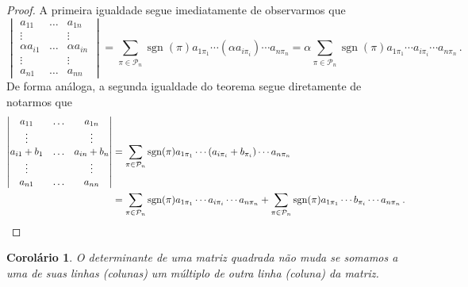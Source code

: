 \documentclass[12pt,a4paper]{report}
\newcommand{\mc}{\mathcal}
\newtheorem{cor}[thm]{Corolário}
\DeclareMathOperator{\sgn}{sgn}
\begin{document}
\begin{proof}
  A primeira igualdade segue imediatamente de observarmos que
  $$\begin{vmatrix}
    a_{11}&\ldots& a_{1n}\\
    \vdots&&\vdots\\
    \alpha a_{i1}&\ldots&\alpha a_{in}\\
    \vdots&&\vdots\\
    a_{n1}&\ldots&a_{nn}
  \end{vmatrix}=\sum_{\pi\in\mc P_n}\sgn(\pi)a_{1\pi_1}\cdots (\alpha a_{i\pi_i})\cdots a_{n\pi_n}
  =\alpha\sum_{\pi\in\mc P_n}\sgn(\pi)a_{1\pi_1}\cdots a_{i\pi_i}\cdots a_{n\pi_n}\,.$$
  De forma análoga, a segunda igualdade do teorema segue diretamente de notarmos que
  \begin{equation*}
    \begin{split}
      \begin{vmatrix}
        a_{11}&\ldots& a_{1n}\\
        \vdots&&\vdots\\
        a_{i1}+b_1&\ldots&a_{in}+b_n\\
        \vdots&&\vdots\\
        a_{n1}&\ldots&a_{nn}
      \end{vmatrix}&=\sum_{\pi\in\mc P_n}\sgn(\pi)a_{1\pi_1}\cdots (a_{i\pi_i}+b_{\pi_i})\cdots a_{n\pi_n}\\
      &=\sum_{\pi\in\mc P_n}\sgn(\pi)a_{1\pi_1}\cdots a_{i\pi_i}\cdots a_{n\pi_n}+\sum_{\pi\in\mc P_n}\sgn(\pi)a_{1\pi_1}\cdots b_{\pi_i}\cdots a_{n\pi_n}\,.\qedhere
    \end{split}
  \end{equation*}
\end{proof}

\begin{cor}
  \label{det.lin1}
  O determinante de uma matriz quadrada não muda se somamos a uma de suas linhas (colunas) um múltiplo de outra linha (coluna) da matriz.
\end{cor}
\end{document}
